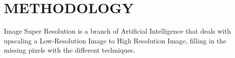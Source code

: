 \newpage
\section{METHODOLOGY}
Image Super Resolution is a branch of Artificial Intelligence that deals with upscaling a Low-Resolution Image to High Resolution Image, filling in the missing pixels with the different techniques.
